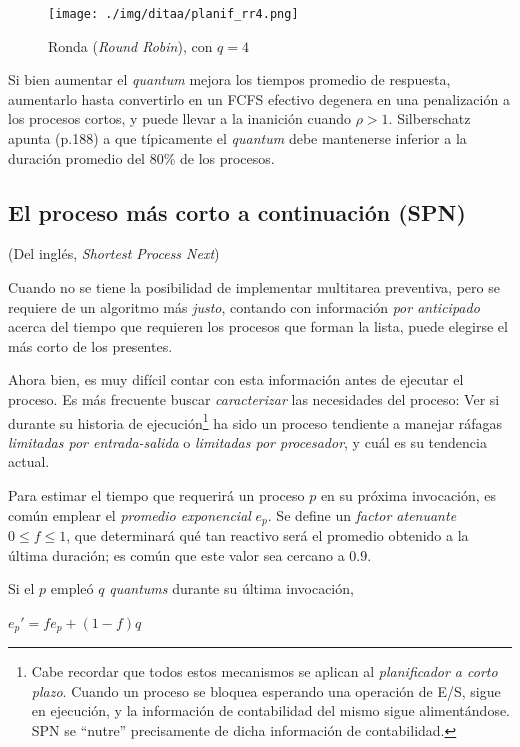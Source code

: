 \documentclass[11pt,fleqn]{book} %
\begin{document}
\begin{figure}[htb]
\centering
\texttt{[image: ./img/ditaa/planif\_rr4.png]}
\caption{\label{PLAN_planif_rr4}Ronda (\emph{Round Robin}), con $q=4$}
\end{figure}

Si bien aumentar el \emph{quantum} mejora los tiempos promedio de
respuesta, aumentarlo hasta convertirlo en un FCFS efectivo degenera
en una penalización a los procesos cortos, y puede llevar a la
inanición cuando $\rho > 1$. Silberschatz apunta (p.188) a que
típicamente el \emph{quantum} debe mantenerse inferior a la duración
promedio del 80\% de los procesos.
\subsection{El proceso más corto a continuación (SPN)}
\label{sec-4-2-4}
\label{PLAN_spn}

(Del inglés, \emph{Shortest Process Next})

Cuando no se tiene la posibilidad de implementar multitarea
preventiva, pero se requiere de un algoritmo más \emph{justo}, contando
con información \emph{por anticipado} acerca del tiempo que requieren los
procesos que forman la lista, puede elegirse el más corto de los
presentes.

Ahora bien, es muy difícil contar con esta información antes de
ejecutar el proceso. Es más frecuente buscar \emph{caracterizar} las
necesidades del proceso: Ver si durante su historia de ejecución\footnote{Cabe recordar que todos estos mecanismos se aplican al
\emph{planificador a corto plazo}. Cuando un proceso se bloquea esperando
una operación de E/S, sigue en ejecución, y la información de
contabilidad del mismo sigue alimentándose. SPN se ``nutre''
precisamente de dicha información de contabilidad. } ha sido un proceso
tendiente a manejar ráfagas \emph{limitadas por entrada-salida} o
\emph{limitadas por procesador}, y cuál es su tendencia actual.

Para estimar el tiempo que requerirá un proceso $p$ en su próxima
invocación, es común emplear el \emph{promedio exponencial}
$e_p$. Se define un \emph{factor atenuante} $0 \le f \le 1$, que
determinará qué tan reactivo será el promedio obtenido a la última
duración; es común que este valor sea cercano a 0.9.

Si el $p$ empleó $q$ \emph{quantums} durante su última invocación,

\begin{center}
$e_p' = fe_p + (1-f)q$
\end{center}
\end{document}
